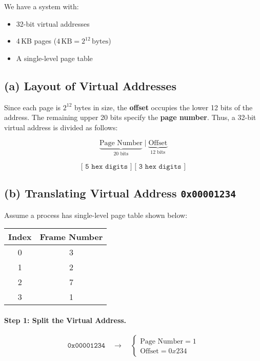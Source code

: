 \documentclass{article}
\begin{document}
We have a system with:
\begin{itemize}
  \item 32-bit virtual addresses
  \item 4\,KB pages (\(4\,\text{KB} = 2^{12}\,\text{bytes}\))
  \item A single-level page table
\end{itemize}

\subsection*{(a) Layout of Virtual Addresses}

Since each page is \(2^{12}\) bytes in size, the \textbf{offset}
occupies the lower 12 bits of the address. The remaining upper
20 bits specify the \textbf{page number}. Thus, a 32-bit virtual
address is divided as follows:

\[
\underbrace{\text{Page Number}}_{20\text{ bits}}
\;\big\vert\;
\underbrace{\text{Offset}}_{12\text{ bits}}
\]

\[
\texttt{[ 5 hex digits ] [ 3 hex digits ]}
\]

\subsection*{(b) Translating Virtual Address \texttt{0x00001234}}

Assume a process has single-level page table shown below:

\bigskip
\begin{center}
\begin{tabular}{|c|c|}
\hline
\textbf{Index} & \textbf{Frame Number} \\
\hline
0 & 3 \\
1 & 2 \\
2 & 7 \\
3 & 1 \\
\hline
\end{tabular}
\end{center}
\bigskip

\paragraph{Step 1: Split the Virtual Address.}

\[
\texttt{0x00001234} \quad \longrightarrow \quad
\begin{cases}
\text{Page Number} = 1 \\
\text{Offset} = 0x234
\end{cases}
\]
\end{document}
